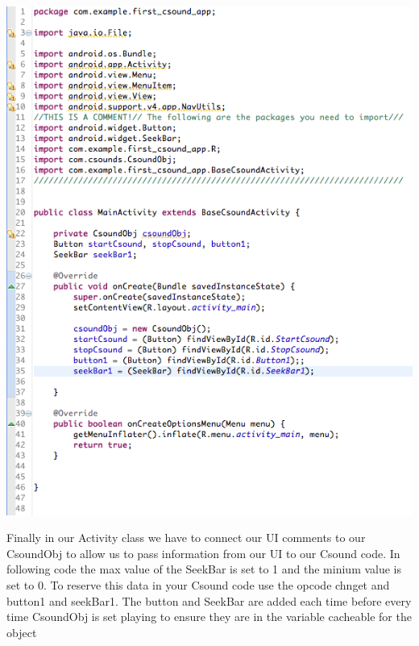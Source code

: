 \documentclass[11pt]{article}
\begin{document}
\begin{center}
\includegraphics[scale=0.60]{images/VariblesCreated}
\end{center}

Finally in our Activity class we have to connect our UI comments to our CsoundObj to allow us to pass information from our UI to our Csound code. In following code the max value of the SeekBar is set to 1 and the minium value is set to 0. To reserve this data in your Csound code use the opcode chnget and button1 and seekBar1. The button and SeekBar are added each time before every time CsoundObj is set playing to ensure they are in the variable cacheable for the object
\end{document}
